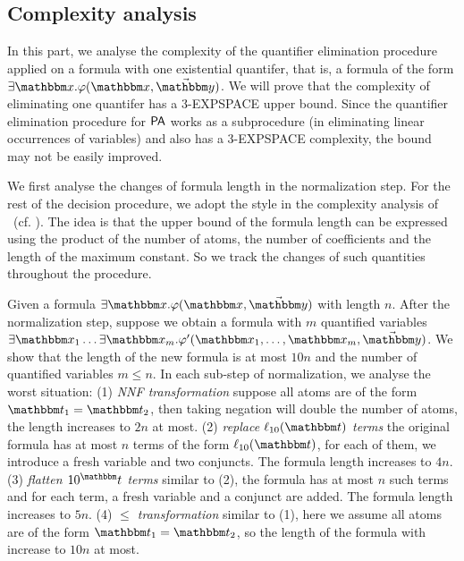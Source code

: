 
\subsection{Complexity analysis}\label{app:cpx}

In this part, we analyse the complexity of the quantifier elimination procedure applied on a formula with one existential quantifer, that is, a formula of the form $\exists \ivarx. \varphi(\ivarx, \vec{\ivary})$. We will prove that the complexity of eliminating one quantifer has a 3-EXPSPACE upper bound. Since the quantifier elimination procedure for ${\sf PA}$ works as a subprocedure (in eliminating linear occurrences of variables) and also has a 3-EXPSPACE complexity, the bound may not be easily improved.

We first analyse the changes of formula length in the normalization step. For the rest of the decision procedure, we adopt the style in the complexity analysis of \pa \ (cf. \cite{Oppen73}). The idea is that the upper bound of the formula length can be expressed using the product of the number of atoms, the number of coefficients and the length of the maximum constant. So we track the changes of such quantities throughout the procedure.

Given a formula $\exists \ivarx. \varphi(\ivarx, \vec{\ivary})$ with length $n$. After the normalization step, suppose we obtain a formula with $m$ quantified variables $\exists \ivarx_1 \dots\exists \ivarx_m. \varphi'(\ivarx_1,\dots, \ivarx_m, \vec{\ivary})$. We show that the length of the new formula is at most $10n$ and the number of quantified variables $m\le n$. In each sub-step of normalization, we analyse the worst situation: 
(1) \textit{NNF transformation} suppose all atoms are of the form $\iterm_1=\iterm_2$, then taking negation will double the number of atoms, the length increases to $2n$ at most. 
(2) \textit{replace $\ell_{10}(\iterm)$ terms} the original formula has at most $n$ terms of the form $\ell_{10}(\iterm)$, for each of them, we introduce a fresh variable and two conjuncts. The formula length increases to $4n$.
(3) \textit{flatten $10^\iterm$ terms} similar to (2), the formula has at most $n$ such terms and for each term, a fresh variable and a conjunct are added. The formula length increases to $5n$. 
(4) \textit{$\le$ transformation} similar to (1), here we assume all atoms are of the form $\iterm_1  = \iterm_2$, so the length of the formula with increase to $10n$ at most. 


